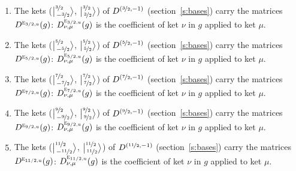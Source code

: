 \documentclass[10pt,a4paper]{article}
\numberwithin{equation}{section}
\newcommand{\irr}[1]{\text{\normalfont\scshape #1}}
\newcommand{\ptag}[1]{\mathrm{#1}}
\newcommand{\irrJp}[2]{D^{(#1,#2)}}
\newcommand{\repD}[1]{D^{#1}}
\newcommand{\intx}{\mu}
\newcommand{\jm}[2]{\bigl\lvert{}^{#1}_{\,#2}\bigr\rangle}
\newenvironment{romanlist}{\begin{enumerate}%
\renewcommand{\labelenumi}{(\roman{enumi})}}%
  {\end{enumerate}}
\begin{document}
\begin{romanlist}
\item The kets ($\jm{\nicefrac{3}{2}}{-\nicefrac{3}{2}}$, $\jm{\nicefrac{3}{2}}{\nicefrac{3}{2}}$) of $\irrJp{\nicefrac{3}{2}}{-1}$ (section~\ref{s:bases}) carry the matrices $\repD{\irr{e}_{3/2,\ptag{u}}}(g)$: $\repD{\irr{e}_{3/2,\ptag{u}}}_{\nu,\intx}(g)$ is the coefficient of ket $\nu$ in $g$ applied to ket $\intx$.
\item The kets ($\jm{\nicefrac{5}{2}}{-\nicefrac{5}{2}}$, $\jm{\nicefrac{5}{2}}{\nicefrac{5}{2}}$) of $\irrJp{\nicefrac{5}{2}}{-1}$ (section~\ref{s:bases}) carry the matrices $\repD{\irr{e}_{5/2,\ptag{u}}}(g)$: $\repD{\irr{e}_{5/2,\ptag{u}}}_{\nu,\intx}(g)$ is the coefficient of ket $\nu$ in $g$ applied to ket $\intx$.
\item The kets ($\jm{\nicefrac{7}{2}}{-\nicefrac{7}{2}}$, $\jm{\nicefrac{7}{2}}{\nicefrac{7}{2}}$) of $\irrJp{\nicefrac{7}{2}}{-1}$ (section~\ref{s:bases}) carry the matrices $\repD{\irr{e}_{7/2,\ptag{u}}}(g)$: $\repD{\irr{e}_{7/2,\ptag{u}}}_{\nu,\intx}(g)$ is the coefficient of ket $\nu$ in $g$ applied to ket $\intx$.
\item The kets ($\jm{\nicefrac{9}{2}}{-\nicefrac{9}{2}}$, $\jm{\nicefrac{9}{2}}{\nicefrac{9}{2}}$) of $\irrJp{\nicefrac{9}{2}}{-1}$ (section~\ref{s:bases}) carry the matrices $\repD{\irr{e}_{9/2,\ptag{u}}}(g)$: $\repD{\irr{e}_{9/2,\ptag{u}}}_{\nu,\intx}(g)$ is the coefficient of ket $\nu$ in $g$ applied to ket $\intx$.
\item The kets ($\jm{\nicefrac{11}{2}}{-\nicefrac{11}{2}}$, $\jm{\nicefrac{11}{2}}{\nicefrac{11}{2}}$) of $\irrJp{\nicefrac{11}{2}}{-1}$ (section~\ref{s:bases}) carry the matrices $\repD{\irr{e}_{11/2,\ptag{u}}}(g)$: $\repD{\irr{e}_{11/2,\ptag{u}}}_{\nu,\intx}(g)$ is the coefficient of ket $\nu$ in $g$ applied to ket $\intx$.
\end{romanlist}
\end{document}
